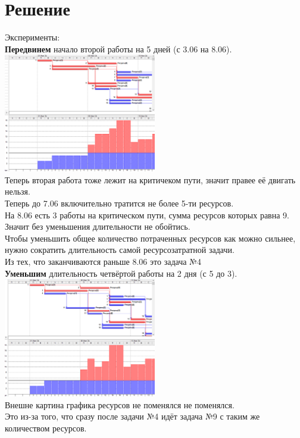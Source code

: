 \documentclass[14pt]{article}
\begin{document}
\section{Решение}
	Эксперименты:\\
	\textbf{Передвинем }начало второй работы на 5 дней (с 3.06 на 8.06).\\
	\includegraphics[width=0.5\textwidth]{../img/ot1a1_1.png}\\
	Теперь вторая работа тоже лежит на критичеком пути, значит правее её двигать нельзя.\\
	Теперь до 7.06 включительно тратится не более 5-ти ресурсов.\\
	На 8.06 есть 3 работы на критическом пути, сумма ресурсов которых равна 9.\\
	Значит без уменьшения длительности не обойтись.\\
	Чтобы уменьшить общее количество потраченных ресурсов как можно сильнее,
		нужно сократить длительность самой ресурсозатратной задачи.\\
	Из тех, что заканчиваются раньше 8.06 это задача №4\\
	\textbf{Уменьшим} длительность четвёртой работы на 2 дня (с 5 до 3).\\
	\includegraphics[width=0.5\textwidth]{../img/ot1a1_2.png}\\
	Внешне картина графика ресурсов не поменялся не поменялся.\\
	Это из-за того, что сразу после задачи №4 идёт задача №9 с таким же количеством ресурсов.\\
\end{document}

